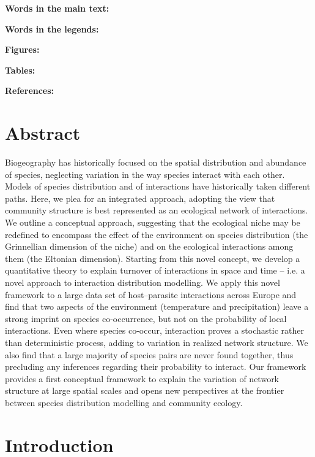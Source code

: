 \documentclass[12pt]{article}
\begin{document}
\textbf{Words in the main text:} 

\textbf{Words in the legends:}  

\textbf{Figures:} 

\textbf{Tables:}     

\textbf{References:} 

\newpage
\doublespacing

\section*{Abstract} 

Biogeography has historically focused on the spatial distribution and
abundance of species, neglecting variation in the way species interact with
each other. Models of species distribution and of interactions have
historically taken different paths. Here, we plea for an integrated approach,
adopting the view that community structure is best represented as an
ecological network of interactions. We outline a conceptual approach,
suggesting that the ecological niche may be redefined to encompass the effect
of the environment on species distribution (the Grinnellian dimension of the
niche) and on the ecological interactions among them (the Eltonian dimension).
Starting from this novel concept, we develop a quantitative theory to explain
turnover of interactions in space and time – i.e. a novel approach to
interaction distribution modelling. We apply this novel framework to a large
data set of host–parasite interactions across Europe and find that two aspects
of the environment (temperature and precipitation) leave a strong imprint on
species co-occurrence, but not on the probability of local interactions. Even
where species co-occur, interaction proves a stochastic rather than
deterministic process, adding to variation in realized network structure. We
also find that a large majority of species pairs are never found together,
thus precluding any inferences regarding their probability to interact. Our
framework provides a first conceptual framework to explain the variation of
network structure at large spatial scales and opens new perspectives at the
frontier between species distribution modelling and community ecology.

\newpage

\section*{Introduction}
\end{document}
